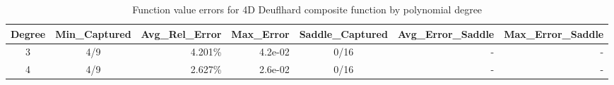 \begin{table}[htbp]
\centering
\caption{Function value errors for 4D Deuflhard composite function by polynomial degree}
\label{tab:deuflhard_4d_errors}
\begin{tabular}{ccrrcrr}
  \toprule
  \textbf{Degree} & \textbf{Min\_Captured} & \textbf{Avg\_Rel\_Error} & \textbf{Max\_Error} & \textbf{Saddle\_Captured} & \textbf{Avg\_Error\_Saddle} & \textbf{Max\_Error\_Saddle} \\\midrule
  3 & 4/9 & 4.201\% & 4.2e-02 & 0/16 & - & - \\
  4 & 4/9 & 2.627\% & 2.6e-02 & 0/16 & - & - \\\bottomrule
\end{tabular}
\end{table}
